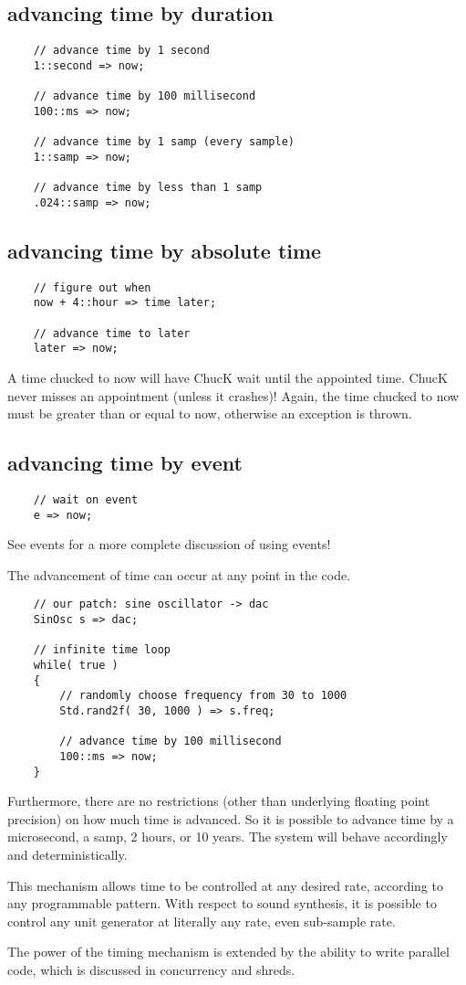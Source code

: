\subsection{advancing time by duration}
\begin{verbatim}
    // advance time by 1 second
    1::second => now;

    // advance time by 100 millisecond
    100::ms => now;

    // advance time by 1 samp (every sample)
    1::samp => now;

    // advance time by less than 1 samp
    .024::samp => now;
\end{verbatim}

\subsection{advancing time by absolute time}

\begin{verbatim}
    // figure out when
    now + 4::hour => time later;

    // advance time to later
    later => now;
\end{verbatim}

A time chucked to now will have ChucK wait until the appointed time. ChucK never misses an appointment (unless it crashes)! Again, the time chucked to now must be greater than or equal to now, otherwise an exception is thrown.

\subsection{advancing time by event}
\begin{verbatim}
    // wait on event
    e => now;
\end{verbatim}

See events for a more complete discussion of using events!

The advancement of time can occur at any point in the code.
\begin{verbatim}
    // our patch: sine oscillator -> dac
    SinOsc s => dac;

    // infinite time loop
    while( true )
    {
        // randomly choose frequency from 30 to 1000
        Std.rand2f( 30, 1000 ) => s.freq;

        // advance time by 100 millisecond
        100::ms => now;
    }
\end{verbatim}

Furthermore, there are no restrictions (other than underlying floating point precision) on how much time is advanced. So it is possible to advance time by a microsecond, a samp, 2 hours, or 10 years. The system will behave accordingly and deterministically.

This mechanism allows time to be controlled at any desired rate, according to any programmable pattern. With respect to sound synthesis, it is possible to control any unit generator at literally any rate, even sub-sample rate.

The power of the timing mechanism is extended by the ability to write parallel code, which is discussed in concurrency and shreds.

